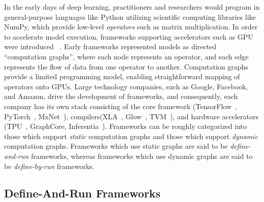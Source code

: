 In the early days of deep learning, practitioners and researchers would program
  in general-purpose languages like Python utilizing
  scientific computing libraries like NumPy,
  which provide low-level \textit{operators} such as matrix multiplication.
In order to accelerate model execution,
    frameworks supporting accelerators such as GPU were introduced~\citep{theano} .
Early frameworks represented models as directed ``computation graphs'',
    where each node represents an operator,
    and each edge represents the flow of data from one operator to another.
Computation graphs provide a limited programming model,
    enabling straightforward mapping of operators onto GPUs.
Large technology companies,
    such as Google, Facebook, and Amazon,
    drive the development of frameworks,
    and consequently,
    each company has its own stack consisting
    of the core framework (TensorFlow~\citep{tensorflow}, PyTorch~\citep{pytorch}, MxNet~\citep{mxnet}),
    compilers(XLA~\citep{xla}, Glow~\citep{glow}, TVM~\citep{tvm_osdi18}),
    and hardware accelerators (TPU~\citep{tpuv1}, GraphCore, Inferentia~\citep{inferentia}).
Frameworks can be roughly categorized into those which support \textit{static} computation graphs
  and those which support \textit{dynamic} computation graphs.
Frameworks which use static graphs are said to be \textit{define-and-run} frameworks,
  whereas frameworks which use dynamic graphs are said to be \textit{define-by-run} frameworks.

\subsection*{Define-And-Run Frameworks}

